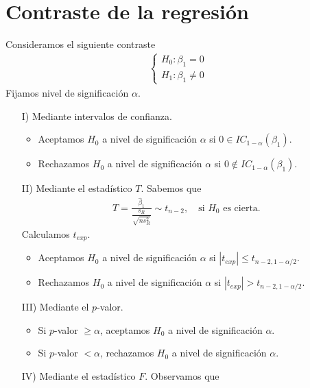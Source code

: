 \section{Contraste de la regresión}
Consideramos el siguiente contraste
\begin{align*}
    \begin{cases}
        H_0 : \beta_1  = 0 \\
        H_1 : \beta_1 \not = 0
    \end{cases}
\end{align*}
Fijamos nivel de significación $\alpha$.
\begin{enumerate}
    \item[I)] Mediante intervalos de confianza.
          \begin{itemize}
              \item Aceptamos $H_0$ a nivel de significación $\alpha$ si $0 \in IC_{1-\alpha}(\beta_1)$.
              \item Rechazamos $H_0$ a nivel de significación $\alpha$ si $0 \not \in IC_{1-\alpha}(\beta_1)$.
          \end{itemize}
    \item[II)] Mediante el estadístico $T$. Sabemos que
          \begin{align*}
              T = \frac{\widehat{\beta}_1}{\dfrac{s_R}{\sqrt{n s_R^2}}} \sim t_{n-2}, \quad \text{si $H_0$ es cierta}.
          \end{align*}
          Calculamos $t_{exp}$.
          \begin{itemize}
              \item Aceptamos $H_0$ a nivel de significación $\alpha$ si $|t_{exp}| \leq t_{n-2,1-\alpha/2}$.
              \item Rechazamos $H_0$ a nivel de significación $\alpha$ si $|t_{exp}| > t_{n-2,1-\alpha/2}$.
          \end{itemize}
    \item[III)] Mediante el $p$-valor.
          \begin{itemize}
              \item Si $p$-valor $\ge \alpha$, aceptamos $H_0$ a nivel de significación $\alpha$.
              \item Si $p$-valor $< \alpha$, rechazamos $H_0$ a nivel de significación $\alpha$.
          \end{itemize}
    \item[IV)] Mediante el estadístico $F$. Observamos que
          \begin{align*}

\end{align*}
\end{enumerate}
